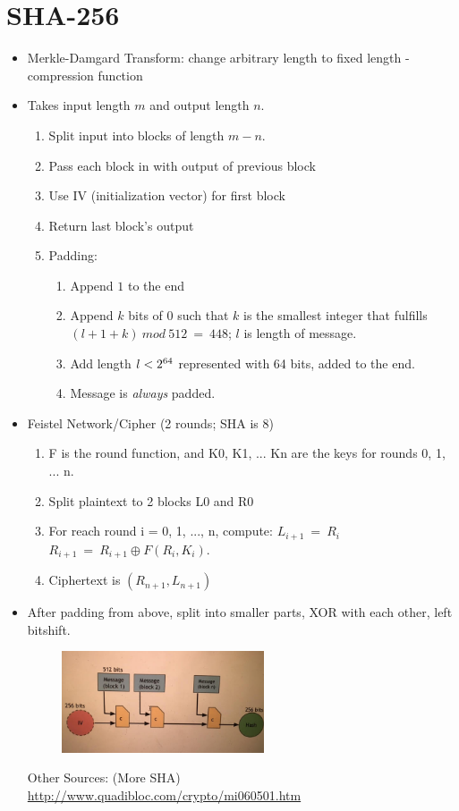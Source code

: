 \documentclass{article}
\begin{document}
\section*{SHA-256}
\begin{itemize}
  \item Merkle-Damgard Transform: change arbitrary length to fixed length - compression function
  \item Takes input length $m$ and output length $n$.
    \begin{enumerate}
      \item Split input into blocks of length $m-n$.
      \item Pass each block in with output of previous block
      \item Use IV (initialization vector) for first block
      \item Return last block's output
      \item Padding: 
        \begin{enumerate}
          \item Append $1$ to the end
          \item Append $k$ bits of $0$ such that $k$ is the smallest integer that fulfills $(l + 1 + k)\ mod\ 512\ =\ 448$; $l$ is length of message.
          \item Add length $l < 2\textsuperscript{64}$ represented with 64 bits, added to the end.
          \item Message is \emph{always} padded.
        \end{enumerate}
    \end{enumerate}
  \item Feistel Network/Cipher (2 rounds; SHA is 8)
    \begin{enumerate}
      \item F is the round function, and K0, K1, ... Kn are the keys for rounds 0, 1, ... n. 
      \item Split plaintext to 2 blocks L0 and R0
      \item For reach round i = 0, 1, ..., n, compute:
        \subitem $L_{i+1}\ =\ R_{i}$
        \subitem $R_{i+1}\ =\ R_{i+1} \oplus F(R_{i}, K_{i})$.
      \item Ciphertext is $(R_{n+1}, L_{n+1})$
    \end{enumerate}
  \item After padding from above, split into smaller parts, XOR with each other, left bitshift.
    \begin{center}
      \includegraphics[width=8cm, height=3cm]{sha.jpg}
    \end{center}
    Other Sources: (More SHA) \url{http://www.quadibloc.com/crypto/mi060501.htm}
\end{itemize}
\end{document}
